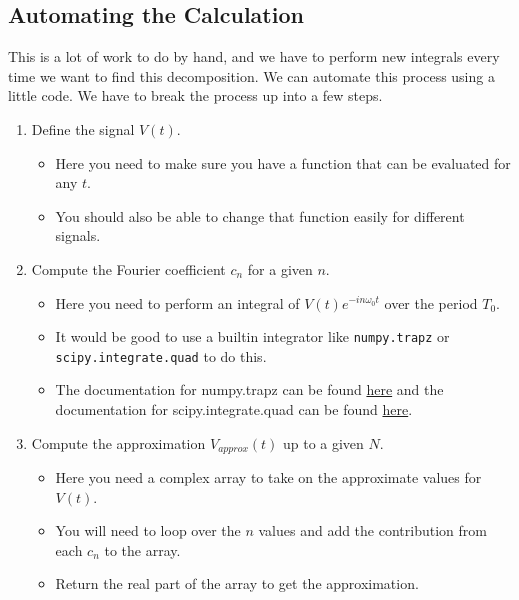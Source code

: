 \subsection{Automating the
Calculation}\label{automating-the-calculation}

This is a lot of work to do by hand, and we have to perform new
integrals every time we want to find this decomposition. We can automate
this process using a little code. We have to break the process up into a
few steps.

\begin{enumerate}
\def\labelenumi{\arabic{enumi}.}
\tightlist
\item
  Define the signal \(V(t)\).

  \begin{itemize}
  \tightlist
  \item
    Here you need to make sure you have a function that can be evaluated
    for any \(t\).
  \item
    You should also be able to change that function easily for different
    signals.
  \end{itemize}
\item
  Compute the Fourier coefficient \(c_n\) for a given \(n\).

  \begin{itemize}
  \tightlist
  \item
    Here you need to perform an integral of \(V(t)e^{-i n \omega_0 t}\)
    over the period \(T_0\).\\
  \item
    It would be good to use a builtin integrator like
    \texttt{numpy.trapz} or \texttt{scipy.integrate.quad} to do this.
  \item
    The documentation for numpy.trapz can be found
    \href{https://docs.scipy.org/doc/numpy/reference/generated/numpy.trapz.html}{here}
    and the documentation for scipy.integrate.quad can be found
    \href{https://docs.scipy.org/doc/scipy/reference/generated/scipy.integrate.quad.html}{here}.
  \end{itemize}
\item
  Compute the approximation \(V_{approx}(t)\) up to a given \(N\).

  \begin{itemize}
  \tightlist
  \item
    Here you need a complex array to take on the approximate values for
    \(V(t)\).
  \item
    You will need to loop over the \(n\) values and add the contribution
    from each \(c_n\) to the array.
  \item
    Return the real part of the array to get the approximation.
  \end{itemize}
\end{enumerate}

